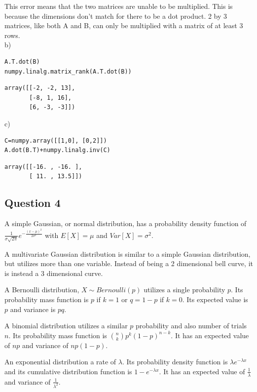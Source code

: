 \documentclass[a4paper]{article}
\begin{document}
This error means that the two matrices are unable to be multiplied. This is because the dimensions don’t match for there to be a dot product. 2 by 3 matrices, like both A and B, can only be multiplied with a matrix of at least 3 rows. \\

b)
\begin{lstlisting}[frame=single]
A.T.dot(B)
numpy.linalg.matrix_rank(A.T.dot(B))
\end{lstlisting}

\begin{lstlisting}
array([[-2, -2, 13],
       [-8, 1, 16],
       [6, -3, -3]])
\end{lstlisting} \par

c)
\begin{lstlisting}[frame=single]
C=numpy.array([[1,0], [0,2]])
A.dot(B.T)+numpy.linalg.inv(C)
\end{lstlisting}

\begin{lstlisting}
array([[-16. , -16. ],
       [ 11. , 13.5]])

\end{lstlisting}

\subsection{Question 4}
A simple Gaussian, or normal distribution, has a probability density function of $\frac{1}{\sigma\sqrt{2\pi}}e^{-\frac{(x-\mu)^{2}}{2\sigma^{2}}}$ with $E[X]=\mu$ and $Var[X]=\sigma^{2}$. \par
A multivariate Gaussian distribution is similar to a simple Gaussian distribution, but utilizes more than one variable. Instead of being a 2 dimensional bell curve, it is instead a 3 dimensional curve. \par
A Bernoulli distribution, $X\mathtt{\sim}Bernoulli(p)$ utilizes a single probability $p$. Its probability mass function is $p$ if $k=1$ or $q=1-p$ if $k=0$. Its expected value is $p$ and variance is $pq$. \par
A binomial distribution utilizes a similar $p$ probability and also number of trials $n$. Its probability mass function is $\binom{n}{k}p^{k}(1-p)^{n-k}$. It has an expected value of $np$ and variance of $np(1-p)$. \par
An exponential distribution a rate of $\lambda$. Its probability density function is $\lambda e^{-\lambda x}$ and its cumulative distribution function is $1-e^{-\lambda x}$. It has an expected value of $\frac{1}{\lambda}$ and variance of $\frac{1}{\lambda ^{2}}$.
\end{document}
